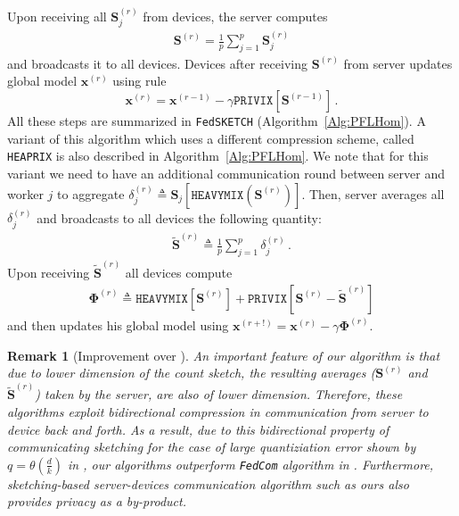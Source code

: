\documentclass{article}
\newtheorem{remark}{Remark}
\begin{document}
Upon receiving all $\mathbf{S}_j^{(r)}$ from devices, the server computes \begin{align}\mathbf{S}^{(r)}=\frac{1}{p}\sum_{j=1}^p\mathbf{S}_j^{(r)}\label{eq:average-skestching}
\end{align} and broadcasts it to all devices. Devices after receiving $\mathbf{S}^{(r)}$ from server updates  global model $\boldsymbol{x}^{(r)}$ using rule $$\boldsymbol{x}^{(r)}=\boldsymbol{x}^{(r-1)}-\gamma \texttt{PRIVIX}\left[\mathbf{S}^{(r-1)}\right]\, .$$
All these steps are summarized in \texttt{FedSKETCH} (Algorithm~\ref{Alg:PFLHom}). A variant of this algorithm which uses a different compression scheme, called \texttt{HEAPRIX} is also described in Algorithm~\ref{Alg:PFLHom}. We note that for this variant we need to have an additional communication round between server and worker $j$ to aggregate $\delta_j^{(r)}\triangleq \mathbf{S}_j\left[\texttt{HEAVYMIX}(\mathbf{S}^{(r)})\right]$. Then, server averages all $\delta^{(r)}_j$ and broadcasts to all devices the following quantity:
\begin{align}
\tilde{\mathbf{S}}^{(r)}\triangleq \frac{1}{p}\sum_{j=1}^p\delta^{(r)}_j \, .\label{eq:glbl-updts}
\end{align}
Upon receiving $\tilde{\mathbf{S}}^{(r)}$  all devices compute
\begin{align}
    {\mathbf{\Phi}}^{(r)}\triangleq \texttt{HEAVYMIX}\left[{\mathbf{S}}^{(r)}\right]+\texttt{PRIVIX}\left[{\mathbf{S}}^{(r)}- \tilde{\mathbf{S}}^{(r)}\right]
\end{align}
and then updates his global model using $\boldsymbol{x}^{(r+!)}=\boldsymbol{x}^{(r)}-\gamma{\mathbf{\Phi}}^{(r)}$.

\begin{remark}[Improvement over \cite{haddadpour2020federated}]
An important feature of our algorithm is that due to lower dimension of the count sketch, the resulting averages ($\mathbf{S}^{(r)}$ and  $\tilde{\mathbf{S}}^{(r)}$) taken by the server, are also of lower dimension. 
Therefore, these algorithms exploit bidirectional compression in communication from server to device back and forth. 
As a result, due to this bidirectional property of communicating sketching for the case of large quantiziation error shown by $q=\theta(\frac{d}{k})$ in \cite{haddadpour2020federated}, our algorithms outperform \texttt{FedCom} algorithm in \cite{haddadpour2020federated}. 
Furthermore, sketching-based server-devices communication algorithm such as ours also provides privacy as a by-product.
\end{remark}
\end{document}
